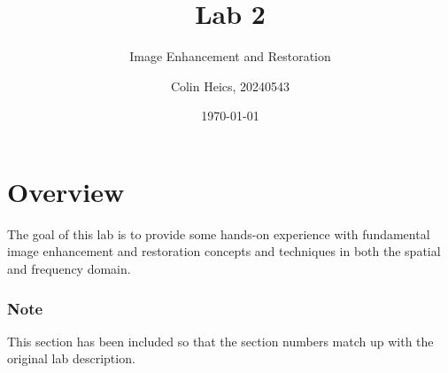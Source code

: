 \documentclass[article, 1.5space, letterpaper, 12pt, oneside, header, footer]{SydeClass}
\title{Lab 2}
\subtitle{Image Enhancement and Restoration}
\author{Colin Heics, 20240543}
\date{\today}
\begin{document}




\section{Overview}
The goal of this lab is to provide some hands-on experience with fundamental image enhancement and restoration concepts and techniques in both the spatial and frequency domain.

\subsubsection{Note}
This section has been included so that the section numbers match up with the original lab description.



















\end{document}
